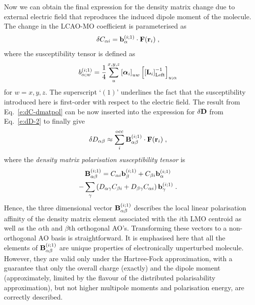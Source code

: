 \documentclass[aip,amsmath,amssymb,reprint,floatfix]{revtex4-1}
\newcommand{\BM}[1]{\bm{#1}}
\begin{document}
Now we can obtain the final expression for the density matrix change 
due to external electric field that reproduces the 
induced dipole moment of the molecule.
The change in the LCAO\hyp{}MO coefficient is parameterised as
%
\begin{equation} \label{e:dC-dmatpol}
 \delta C_{\alpha i} = {\bf b}_{\alpha}^{(i;1)} \cdot {\bf F}({\bf r}_i)  \;,
\end{equation}
%
where the susceptibility tensor is defined as
%
\begin{equation} \label{e:susceptibility-b}
  b_{\alpha;w}^{(i;1)}= \frac{1}{4} \sum_u^{x, y, z} \left[ {\BM{\alpha}}_i \right]_{uw}
   \left[ \left[ {\bf L}_i  \right]^{-1}_{\rm Left} \right]_{u;\alpha}  
\end{equation}
%
for $w=x,y,z$. 
The superscript `$(1)$' underlines the fact that the susceptibility introduced here
is first\hyp{}order with respect to the electric field.
The result from Eq.~\eqref{e:dC-dmatpol} can be now inserted into 
the expression for $\delta {\bf D}$ from Eq.~\eqref{e:dD-2} to finally give
%
\begin{equation}\label{e:final-model.HF}
 \delta D_{\alpha\beta} \approx \sum_i^{\rm occ} {\bf B}^{(i;1)}_{\alpha\beta} \cdot {\bf F}({\bf r}_i)  \;,
\end{equation}
%
where the \emph{density matrix polarisation susceptibility tensor} is
%
\begin{multline}  \label{e:susceptibility-B}
 {\bf B}^{(i;1)}_{\alpha\beta} = 
                               C_{\alpha i} {\bf b}_{\beta}^{(i;1)} + C_{\beta i} {\bf b}_\alpha^{(i;1)} \\
                                - \sum_\gamma 
                                 \left( 
               D_{\alpha\gamma} C_{\beta i} + D_{\beta\gamma} C_{\alpha i}
                                 \right)
                                           {\bf b}_{\gamma}^{(i;1)}
 \;.
\end{multline}
%
Hence, the three dimensional vector ${\bf B}^{(i;1)}_{\alpha\beta}$ 
describes the local linear polarisation affinity 
of the density matrix element 
associated with the $i$th LMO centroid as well as the $\alpha$th and $\beta$th orthogonal AO's.
Transforming these vectors to a non\hyp{}orthogonal AO basis is straightforward.
It is emphasised here that all the elements of ${\bf B}_{\alpha\beta}^{(i;1)}$
are unique properties of electronically unperturbed molecule. 
However, they are valid only under the Hartree\hyp{}Fock
approximation, with a guarantee that only the overall charge (exactly) and the dipole moment (approximately,
limited by the flavour of the distributed polarisability approximation), 
but not higher multipole moments and polarisation energy, are correctly described.
\end{document}
